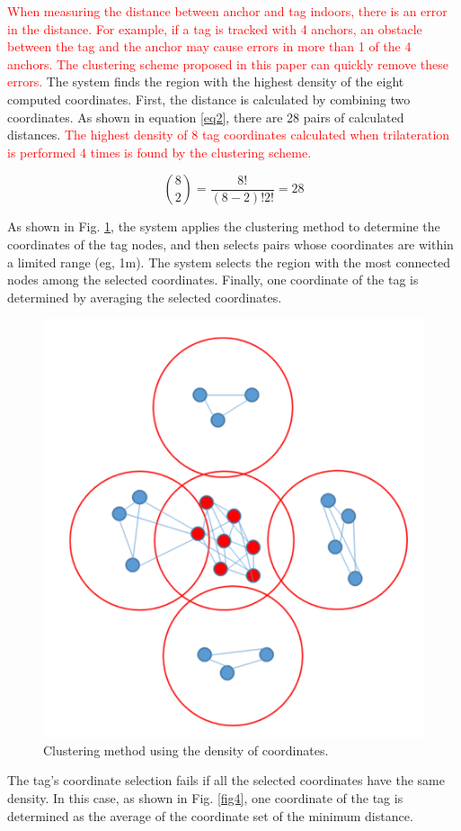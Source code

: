 \documentclass[conference]{IEEEtran}
\begin{document}
\textcolor{red}{When measuring the distance between anchor and tag indoors, there is an error in the distance. For example, if a tag is tracked with 4 anchors, an obstacle between the tag and the anchor may cause errors in more than 1 of the 4 anchors. The clustering scheme proposed in this paper can quickly remove these errors.} The system finds the region with the highest density of the eight computed coordinates. First, the distance is calculated by combining two coordinates. As shown in equation \ref{eq2}, there are 28 pairs of calculated distances. \textcolor{red}{The highest density of 8 tag coordinates calculated when trilateration is performed 4 times is found by the clustering scheme.}

\begin{equation}
    \binom{8}{2} = \frac{8!}{(8-2)!2!}=28\label{eq2}
\end{equation}

As shown in Fig. \ref{fig3}, the system applies the clustering method to determine the coordinates of the tag nodes, and then selects pairs whose coordinates are within a limited range (eg, 1m). The system selects the region with the most connected nodes among the selected coordinates. Finally, one coordinate of the tag is determined by averaging the selected coordinates.

\begin{figure}[htbp]
    \centerline{\includegraphics[width=0.62\columnwidth]{fig3.png}}
    \caption{Clustering method using the density of coordinates.}
    \label{fig3}
\end{figure}

The tag's coordinate selection fails if all the selected coordinates have the same density. In this case, as shown in Fig. \ref{fig4}, one coordinate of the tag is determined as the average of the coordinate set of the minimum distance.
\end{document}
